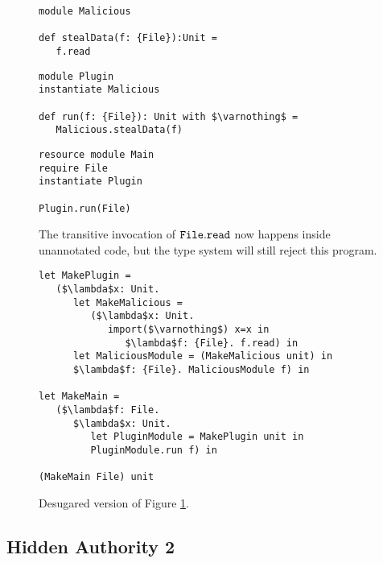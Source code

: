 \begin{figure}[h]

\begin{lstlisting}
module Malicious

def stealData(f: {File}):Unit =
   f.read
\end{lstlisting}

\begin{lstlisting}
module Plugin
instantiate Malicious

def run(f: {File}): Unit with $\varnothing$ =
   Malicious.stealData(f)
\end{lstlisting}

\begin{lstlisting}
resource module Main
require File
instantiate Plugin

Plugin.run(File)
\end{lstlisting}

\caption{The transitive invocation of $\mathtt{File.read}$ now happens inside unannotated code, but the type system will still reject this program.}
\label{fig:eg6}
\end{figure}

\begin{figure}[h]

\begin{lstlisting}
let MakePlugin =
   ($\lambda$x: Unit.
      let MakeMalicious =
         ($\lambda$x: Unit.
            import($\varnothing$) x=x in
               $\lambda$f: {File}. f.read) in
      let MaliciousModule = (MakeMalicious unit) in
      $\lambda$f: {File}. MaliciousModule f) in
      
let MakeMain =
   ($\lambda$f: File.
      $\lambda$x: Unit.
         let PluginModule = MakePlugin unit in
         PluginModule.run f) in

(MakeMain File) unit
\end{lstlisting}

\caption{Desugared version of Figure \ref{fig:eg6}.}
\label{fig:eg6_desugared}
\end{figure}

\subsection{Hidden Authority 2} 

